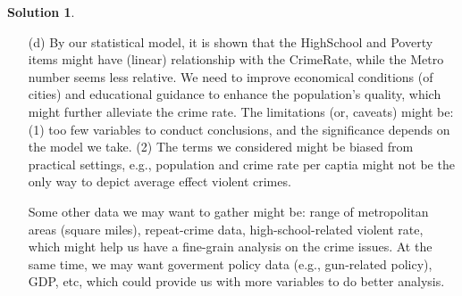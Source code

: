 \documentclass[11pt,letterpaper,english,oneside]{article} %
\theoremstyle{definition} %
\newtheorem{solution}{Solution}
\newenvironment{sol}{\begin{solution}\hspace{0pt}}{\end{solution}}
\begin{document}
\begin{sol}
\begin{itemize}
\item[(d)] By our statistical model, it is shown that the HighSchool and Poverty items might have (linear) relationship with the CrimeRate, while the Metro number seems less relative. We need to improve economical conditions (of cities) and educational guidance to enhance the population's quality, which might further alleviate the crime rate. The limitations (or, caveats) might be: (1) too few variables to conduct conclusions, and the significance depends on the model we take. (2) The terms we considered might be biased from practical settings, e.g., population and crime rate per captia might not be the only way to depict average effect violent crimes.

Some other data we may want to gather might be: range of metropolitan areas (square miles), repeat-crime data, high-school-related violent rate, which might help us have a fine-grain analysis on the crime issues. At the same time, we may want goverment policy data (e.g., gun-related policy), GDP, etc, which could provide us with more variables to do better analysis.

\end{itemize}
 \end{sol}
\end{document}
